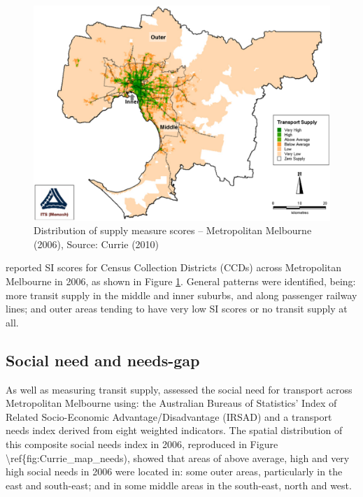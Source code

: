 \documentclass[preprint, 3p,
authoryear]{elsarticle} %
\begin{document}
\begin{figure}
\includegraphics[width=1\linewidth]{graphics/Currie2010SI} \caption{Distribution of supply measure scores – Metropolitan Melbourne (2006), Source: Currie (2010)}\label{fig:Currie_map_SI}
\end{figure}

\citet{currie2010identifying} reported SI scores for Census Collection
Districts (CCDs) across Metropolitan Melbourne in 2006, as shown in
Figure \ref{fig:Currie_map_SI}. General patterns were identified, being:
more transit supply in the middle and inner suburbs, and along passenger
railway lines; and outer areas tending to have very low SI scores or no
transit supply at all.

\hypertarget{social-need-and-needs-gap}{%
\subsection{Social need and needs-gap}\label{social-need-and-needs-gap}}

As well as measuring transit supply, \citet{currie2010identifying}
assessed the social need for transport across Metropolitan Melbourne
using: the Australian Bureaus of Statistics' Index of Related
Socio-Economic Advantage/Disadvantage (IRSAD) and a transport needs
index derived from eight weighted indicators. The spatial distribution
of this composite social needs index in 2006, reproduced in Figure
\textbackslash ref\{fig:Currie\_map\_needs), showed that areas of above
average, high and very high social needs in 2006 were located in: some
outer areas, particularly in the east and south-east; and in some middle
areas in the south-east, north and west.
\end{document}

